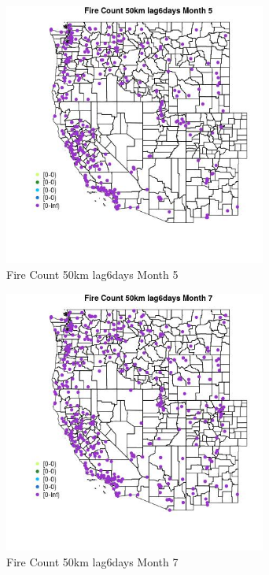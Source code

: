 \begin{figure} 
\centering  
\includegraphics[width=0.77\textwidth]{Code_Outputs/Report_ML_input_PM25_Step4_part_e_de_duplicated_aves_compiled_2019-05-18wNAs_MapObsMo5Fire_Count_50km_lag6days.jpg} 
\caption{\label{fig:Report_ML_input_PM25_Step4_part_e_de_duplicated_aves_compiled_2019-05-18wNAsMapObsMo5Fire_Count_50km_lag6days}Fire Count 50km lag6days Month 5} 
\end{figure} 
 

\begin{figure} 
\centering  
\includegraphics[width=0.77\textwidth]{Code_Outputs/Report_ML_input_PM25_Step4_part_e_de_duplicated_aves_compiled_2019-05-18wNAs_MapObsMo7Fire_Count_50km_lag6days.jpg} 
\caption{\label{fig:Report_ML_input_PM25_Step4_part_e_de_duplicated_aves_compiled_2019-05-18wNAsMapObsMo7Fire_Count_50km_lag6days}Fire Count 50km lag6days Month 7} 
\end{figure} 
 

